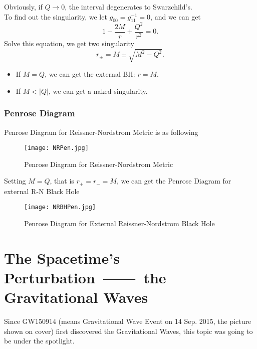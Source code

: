 \documentclass[openany,10pt]{book}
\theoremstyle{definition}
\theoremstyle{definition}
\theoremstyle{remark}
\begin{document}
Obviously, if $Q\rightarrow 0$, the interval degenerates to Swarzchild's.\\

To find out the singularity, we let $g_{00}=g_{11}^{-1}=0$, and we can get 
\begin{equation}
    1-\frac{2M}{r}+\frac{Q^2}{r^2}=0.
\end{equation}
Solve this equation, we get two singularity 
\begin{equation}
   r_{\pm}=M\pm\sqrt{M^2-Q^2}.
\end{equation}

\begin{itemize}
    \item {If $M=Q$, we can get the external BH: $r=M$. }
    \item{If $M<|Q|$, we can get a naked singularity. }
\end{itemize}



\subsection{Penrose Diagram}
Penrose Diagram for Reissner-Nordstrom Metric is as following 

\begin{figure}[htbp]
    \centering
    \texttt{[image: NRPen.jpg]}
    \caption{Penrose Diagram for Reissner-Nordstrom Metric }
    
\end{figure}

Setting $M=Q$, that is $r_+=r_-=M$, we can get the Penrose Diagram for external R-N Black Hole

\begin{figure}[htbp]
    \centering
    \texttt{[image: NRBHPen.jpg]}
    \caption{Penrose Diagram for External Reissner-Nordstrom Black Hole }
    
\end{figure}











\chapter{ The Spacetime's Perturbation\ ------\ the Gravitational Waves}
Since GW150914 (means Gravitational Wave Event on 14 Sep. 2015, the picture shown on cover) first discovered the Gravitational Waves, this topic was going to be under the spotlight.
\end{document}
